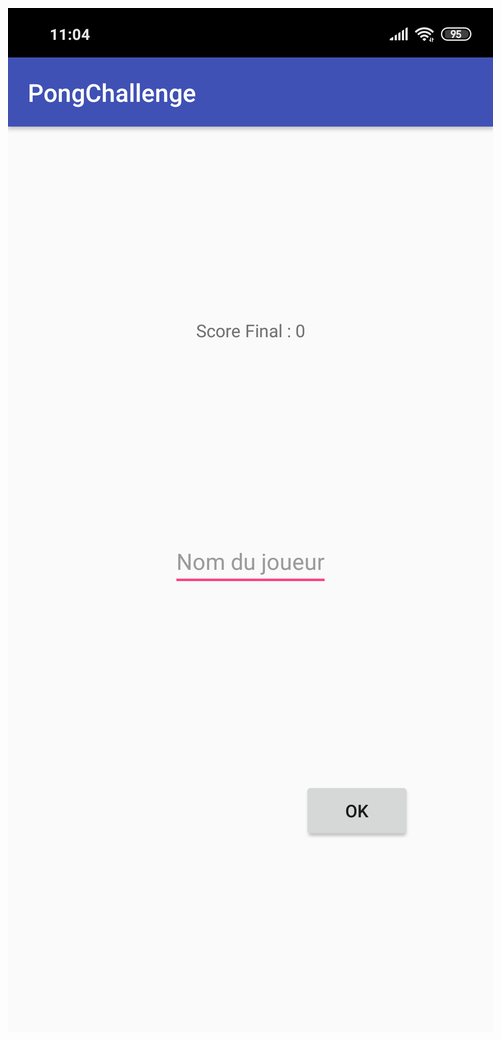 \documentclass{article}
\begin{document}
\begin{center}
  \includegraphics[scale=0.08]{screenAdd.png}

\end{center}
\end{document}
